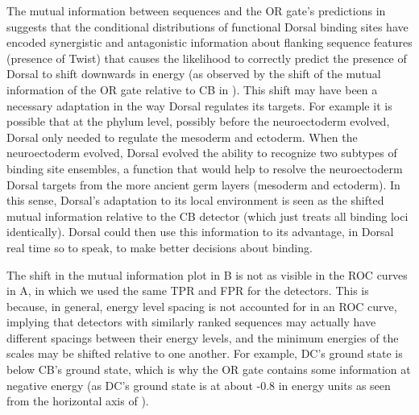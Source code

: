  The mutual information between sequences and the OR gate's predictions in   suggests that the conditional distributions of functional Dorsal binding sites have encoded synergistic and antagonistic information about flanking sequence features (presence of Twist) that causes the likelihood to correctly predict the presence of Dorsal to shift downwards in energy (as observed by the shift of the mutual information of the OR gate relative to CB in ).  This shift may have been a necessary adaptation in the way Dorsal regulates its targets.  For example it is possible that at the phylum level, possibly before the neuroectoderm evolved, Dorsal only needed to regulate the mesoderm and ectoderm. When the neuroectoderm evolved, Dorsal evolved the ability to recognize two subtypes of binding site ensembles, a function that would help to resolve the neuroectoderm Dorsal targets from the more ancient germ layers (mesoderm and ectoderm).  In this sense, Dorsal's adaptation to its local environment is seen as the shifted mutual information relative to the CB detector (which just treats all binding loci identically).  Dorsal could then use this information to its advantage, in Dorsal real time so to speak, to make better decisions about binding.    
  
 The shift in the mutual information plot in  B is not as visible in the ROC curves in A, in which we used the same TPR and FPR for the detectors.  This is because, in general, energy level spacing is not accounted for in an ROC curve, implying that detectors with similarly ranked sequences may actually have different spacings between their energy levels, and the minimum energies of the scales may be shifted relative to one another.  For example, DC's ground state is below CB's ground state, which is why the OR gate contains some information at negative energy (as DC's ground state is at about -0.8 in energy units as seen from the horizontal axis of ).
     
